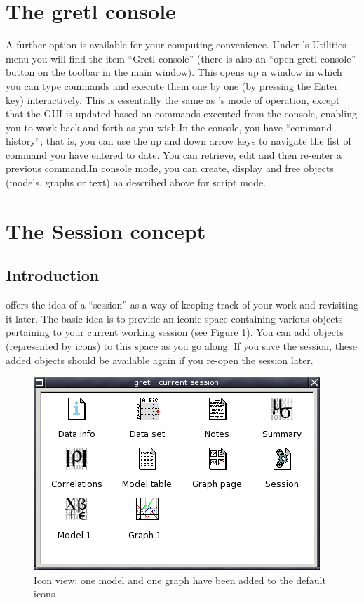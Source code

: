 \section{The gretl console}
\label{console}

A further option is available for your computing convenience. Under
's Utilities menu you will find the item ``Gretl console''
(there is also an ``open gretl console'' button on the toolbar in the
main window).  This opens up a window in which you can type commands
and execute them one by one (by pressing the Enter key) interactively.
This is essentially the same as 's mode of operation,
except that the GUI is updated based on commands executed from the
console, enabling you to work back and forth as you wish.In the
console, you have ``command history''; that is, you can use the up and
down arrow keys to navigate the list of command you have entered to
date.  You can retrieve, edit and then re-enter a previous command.In
console mode, you can create, display and free objects (models, graphs
or text) aa described above for script mode.

\section{The Session concept}
\label{session}



\subsection{Introduction}
\label{session-intro}


 offers the idea of a ``session'' as a way of keeping track
of your work and revisiting it later. The basic idea is to provide an
iconic space containing various objects pertaining to your current
working session (see Figure \ref{fig-session}).  You can add objects
(represented by icons) to this space as you go along.  If you save the
session, these added objects should be available again if you re-open
the session later.
\begin{figure}[htbp]
  \caption{Icon view: one model and one graph have been added to the
    default icons}
  \label{fig-session}
  \begin{center}
    \includegraphics[scale=0.5]{figures/session}
  \end{center}
\end{figure}

